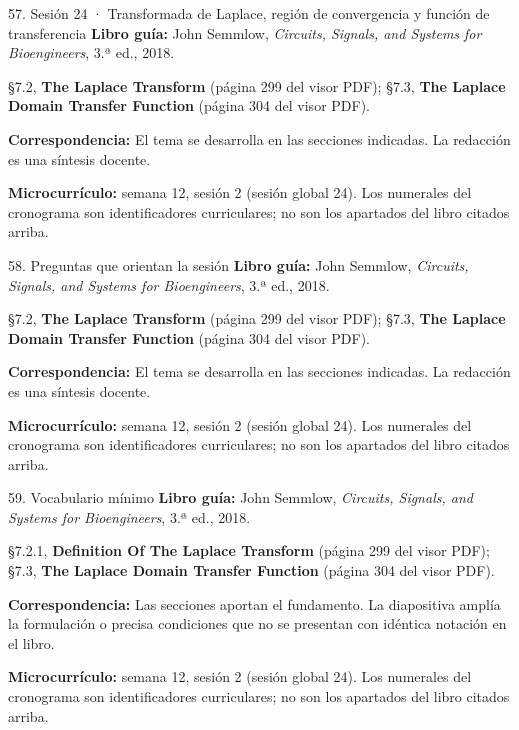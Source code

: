 \documentclass[
  10pt,
  ignorenonframetext,
  aspectratio=169,
  spanish,
]{beamer}
\begin{document}
\begin{frame}{57. Sesión 24 · Transformada de Laplace, región de
convergencia y función de transferencia}
\label{sesiuxf3n-24-transformada-de-laplace-regiuxf3n-de-convergencia-y-funciuxf3n-de-transferencia}
\textbf{Libro guía:} John Semmlow, \emph{Circuits, Signals, and Systems
for Bioengineers}, 3.ª ed., 2018.

§7.2, \textbf{The Laplace Transform} (página 299 del visor PDF); §7.3,
\textbf{The Laplace Domain Transfer Function} (página 304 del visor
PDF).

\textbf{Correspondencia:} El tema se desarrolla en las secciones
indicadas. La redacción es una síntesis docente.

\textbf{Microcurrículo:} semana 12, sesión 2 (sesión global 24). Los
numerales del cronograma son identificadores curriculares; no son los
apartados del libro citados arriba.
\end{frame}

\begin{frame}{58. Preguntas que orientan la sesión}
\label{preguntas-que-orientan-la-sesiuxf3n-3}
\textbf{Libro guía:} John Semmlow, \emph{Circuits, Signals, and Systems
for Bioengineers}, 3.ª ed., 2018.

§7.2, \textbf{The Laplace Transform} (página 299 del visor PDF); §7.3,
\textbf{The Laplace Domain Transfer Function} (página 304 del visor
PDF).

\textbf{Correspondencia:} El tema se desarrolla en las secciones
indicadas. La redacción es una síntesis docente.

\textbf{Microcurrículo:} semana 12, sesión 2 (sesión global 24). Los
numerales del cronograma son identificadores curriculares; no son los
apartados del libro citados arriba.
\end{frame}

\begin{frame}{59. Vocabulario mínimo}
\label{vocabulario-muxednimo-3}
\textbf{Libro guía:} John Semmlow, \emph{Circuits, Signals, and Systems
for Bioengineers}, 3.ª ed., 2018.

§7.2.1, \textbf{Definition Of The Laplace Transform} (página 299 del
visor PDF); §7.3, \textbf{The Laplace Domain Transfer Function} (página
304 del visor PDF).

\textbf{Correspondencia:} Las secciones aportan el fundamento. La
diapositiva amplía la formulación o precisa condiciones que no se
presentan con idéntica notación en el libro.

\textbf{Microcurrículo:} semana 12, sesión 2 (sesión global 24). Los
numerales del cronograma son identificadores curriculares; no son los
apartados del libro citados arriba.
\end{frame}
\end{document}
